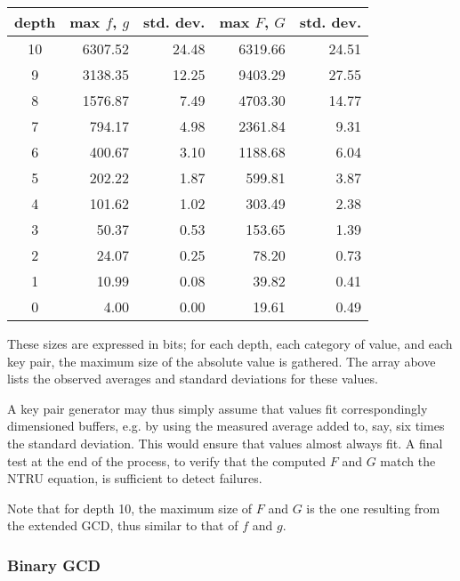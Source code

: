\begin{center}
\begin{tabular}{|c|r|r|r|r|}
\hline
\textbf{\textsf{depth}} & \textbf{\textsf{max} $f$, $g$} & \textbf{\textsf{std. dev.}}
  & \textbf{\textsf{max} $F$, $G$} & \textbf{\textsf{std. dev.}} \\
\hline
 10 & 6307.52 & 24.48 & 6319.66 & 24.51 \\
  9 & 3138.35 & 12.25 & 9403.29 & 27.55 \\
  8 & 1576.87 &  7.49 & 4703.30 & 14.77 \\
  7 &  794.17 &  4.98 & 2361.84 &  9.31 \\
  6 &  400.67 &  3.10 & 1188.68 &  6.04 \\
  5 &  202.22 &  1.87 &  599.81 &  3.87 \\
  4 &  101.62 &  1.02 &  303.49 &  2.38 \\
  3 &   50.37 &  0.53 &  153.65 &  1.39 \\
  2 &   24.07 &  0.25 &   78.20 &  0.73 \\
  1 &   10.99 &  0.08 &   39.82 &  0.41 \\
  0 &    4.00 &  0.00 &   19.61 &  0.49 \\
\hline
\end{tabular}
\end{center}

These sizes are expressed in bits; for each depth, each category of
value, and each key pair, the maximum size of the absolute value is
gathered. The array above lists the observed averages and standard
deviations for these values.

A \falcon key pair generator may thus simply assume that values fit
correspondingly dimensioned buffers, e.g. by using the measured average
added to, say, six times the standard deviation. This would ensure that
values almost always fit. A final test at the end of the process, to
verify that the computed $F$ and $G$ match the NTRU equation, is
sufficient to detect failures.

Note that for depth 10, the maximum size of $F$ and $G$ is the one
resulting from the extended GCD, thus similar to that of $f$ and $g$.

\subsubsection{Binary GCD}

